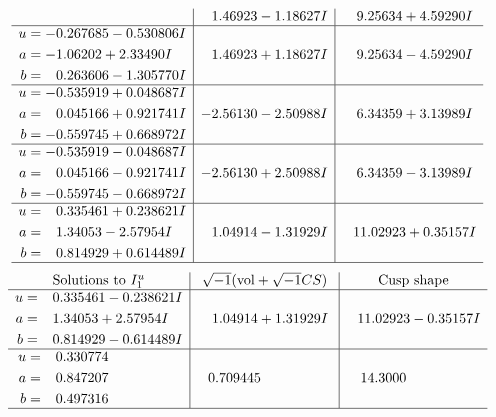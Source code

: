\documentclass[1p]{elsarticle_modified}
\theoremstyle{definition}
\newcommand{\I}{\sqrt{-1}}
\begin{document}
$$\begin{array}{c|c|c}
 & \phantom{-}1.46923 - 1.18627 I & \phantom{-}9.25634 + 4.59290 I \\ \hline\begin{aligned}
u &= -0.267685 - 0.530806 I \\
a &= -1.06202 + 2.33490 I \\
b &= \phantom{-}0.263606 - 1.305770 I\end{aligned}
 & \phantom{-}1.46923 + 1.18627 I & \phantom{-}9.25634 - 4.59290 I \\ \hline\begin{aligned}
u &= -0.535919 + 0.048687 I \\
a &= \phantom{-}0.045166 + 0.921741 I \\
b &= -0.559745 + 0.668972 I\end{aligned}
 & -2.56130 - 2.50988 I & \phantom{-}6.34359 + 3.13989 I \\ \hline\begin{aligned}
u &= -0.535919 - 0.048687 I \\
a &= \phantom{-}0.045166 - 0.921741 I \\
b &= -0.559745 - 0.668972 I\end{aligned}
 & -2.56130 + 2.50988 I & \phantom{-}6.34359 - 3.13989 I \\ \hline\begin{aligned}
u &= \phantom{-}0.335461 + 0.238621 I \\
a &= \phantom{-}1.34053 - 2.57954 I \\
b &= \phantom{-}0.814929 + 0.614489 I\end{aligned}
 & \phantom{-}1.04914 - 1.31929 I & \phantom{-}11.02923 + 0.35157 I\\
 \hline 
 \end{array}$$\newpage$$\begin{array}{c|c|c}  
\text{Solutions to }I^u_{1}& \I (\text{vol} + \sqrt{-1}CS) & \text{Cusp shape}\\
 \hline 
\begin{aligned}
u &= \phantom{-}0.335461 - 0.238621 I \\
a &= \phantom{-}1.34053 + 2.57954 I \\
b &= \phantom{-}0.814929 - 0.614489 I\end{aligned}
 & \phantom{-}1.04914 + 1.31929 I & \phantom{-}11.02923 - 0.35157 I \\ \hline\begin{aligned}
u &= \phantom{-}0.330774\phantom{ +0.000000I} \\
a &= \phantom{-}0.847207\phantom{ +0.000000I} \\
b &= \phantom{-}0.497316\phantom{ +0.000000I}\end{aligned}
 & \phantom{-}0.709445\phantom{ +0.000000I} & \phantom{-}14.3000\phantom{ +0.000000I}\\
 \hline 
 \end{array}$$\newpage
\end{document}
